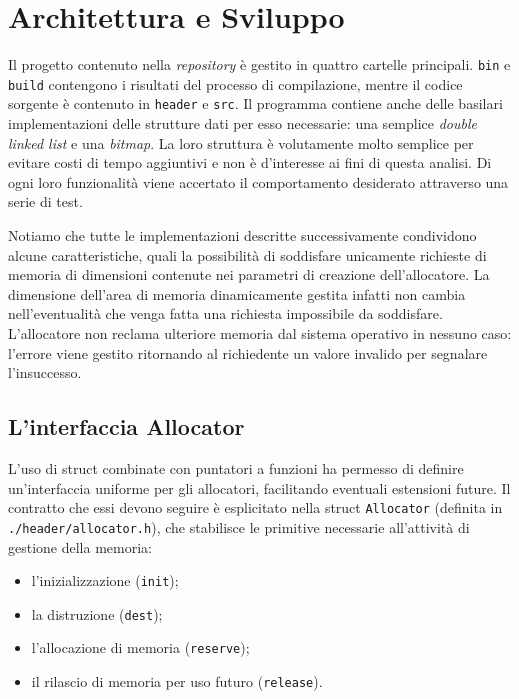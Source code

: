 \chapter{Architettura e Sviluppo}
Il progetto contenuto nella \textit{repository} è gestito in quattro cartelle principali. \texttt{bin} e \texttt{build} contengono i risultati del processo di compilazione, mentre il codice sorgente è contenuto in \texttt{header} e \texttt{src}. Il programma contiene anche delle basilari implementazioni delle strutture dati per esso necessarie: una semplice \textit{double linked list} e una \textit{bitmap}. La loro struttura è volutamente molto semplice per evitare costi di tempo aggiuntivi e non è d’interesse ai fini di questa analisi. Di ogni loro funzionalità viene accertato il comportamento desiderato attraverso una serie di test.

Notiamo che tutte le implementazioni descritte successivamente condividono alcune caratteristiche, quali la possibilità di soddisfare unicamente richieste di memoria di dimensioni contenute nei parametri di creazione dell'allocatore. La dimensione dell’area di memoria dinamicamente gestita infatti non cambia nell’eventualità che venga fatta una richiesta impossibile da soddisfare. L’allocatore non reclama ulteriore memoria dal sistema operativo in nessuno caso: l’errore viene gestito ritornando al richiedente un valore invalido per segnalare l’insuccesso. 

\section{L’interfaccia Allocator}
L’uso di struct combinate con puntatori a funzioni ha permesso di definire un’interfaccia uniforme per gli allocatori, facilitando eventuali estensioni future. Il contratto che essi devono seguire è esplicitato nella struct \texttt{Allocator} (definita in \texttt{./header/allocator.h}), che stabilisce le primitive necessarie all'attività di gestione della memoria:

\begin{itemize}
    \item l’inizializzazione (\texttt{init});
    \item la distruzione (\texttt{dest});
    \item l’allocazione di memoria (\texttt{reserve});
    \item il rilascio di memoria per uso futuro (\texttt{release}).
\end{itemize}

